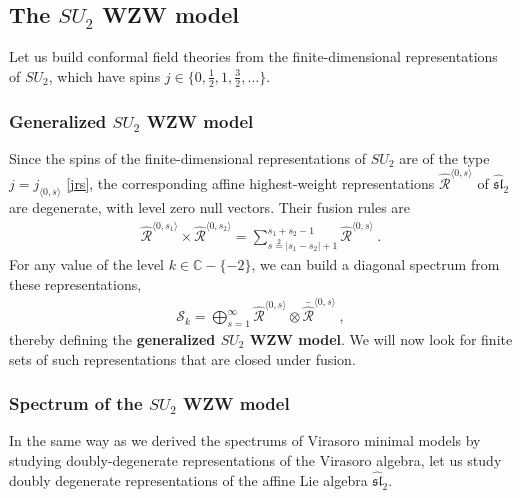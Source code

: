 \documentclass[12pt, a4paper, notitlepage, twoside]{report}
\numberwithin{equation}{section}
\theoremstyle{break}
\begin{document}
\subsection{The \texorpdfstring{$SU_2$}{SU(2)} WZW model \label{secsu}}

Let us build conformal field theories from the finite-dimensional representations of $SU_2$, which have spins $j\in\{0,\frac12,1,\frac32,\dots\}$.

\subsubsection{Generalized $SU_2$ WZW model}

Since the spins of the finite-dimensional representations of $SU_2$ are of the type $j=j_{\langle 0,s\rangle}$ \eqref{jrs}, the 
corresponding affine highest-weight representations $\hat{\mathcal{R}}^{\langle 0,s\rangle}$ of $\widehat{\mathfrak{sl}}_2$ are degenerate, with level zero null vectors.
Their fusion rules are 
\begin{align}
 \hat{\mathcal{R}}^{\langle 0, s_1\rangle}\times\hat{\mathcal{R}}^{\langle 0, s_2\rangle} = \sum_{s\overset{2}{=}|s_1-s_2|+1}^{s_1+s_2-1} \hat{\mathcal{R}}^{\langle 0, s\rangle}\ .
\end{align}
For any value of the level $k\in\mathbb{C}-\{-2\}$, we can build a diagonal spectrum from these representations,
\begin{align}
 \mathcal{S}_k = \bigoplus_{s=1}^\infty \hat{\mathcal{R}}^{\langle 0, s\rangle}\otimes \bar{\hat{\mathcal{R}}}^{\langle 0, s\rangle}\ ,
\end{align}
thereby defining the \textbf{\boldmath generalized $SU_2$ WZW model}. 
We will now look for finite sets of such representations that are closed under fusion.

\subsubsection{Spectrum of the $SU_2$ WZW model}

In the same way as we derived the spectrums of Virasoro minimal models by studying doubly-degenerate representations of the Virasoro algebra, let us study doubly degenerate representations of the affine Lie algebra $\widehat{\mathfrak{sl}}_2$. 
\end{document}
